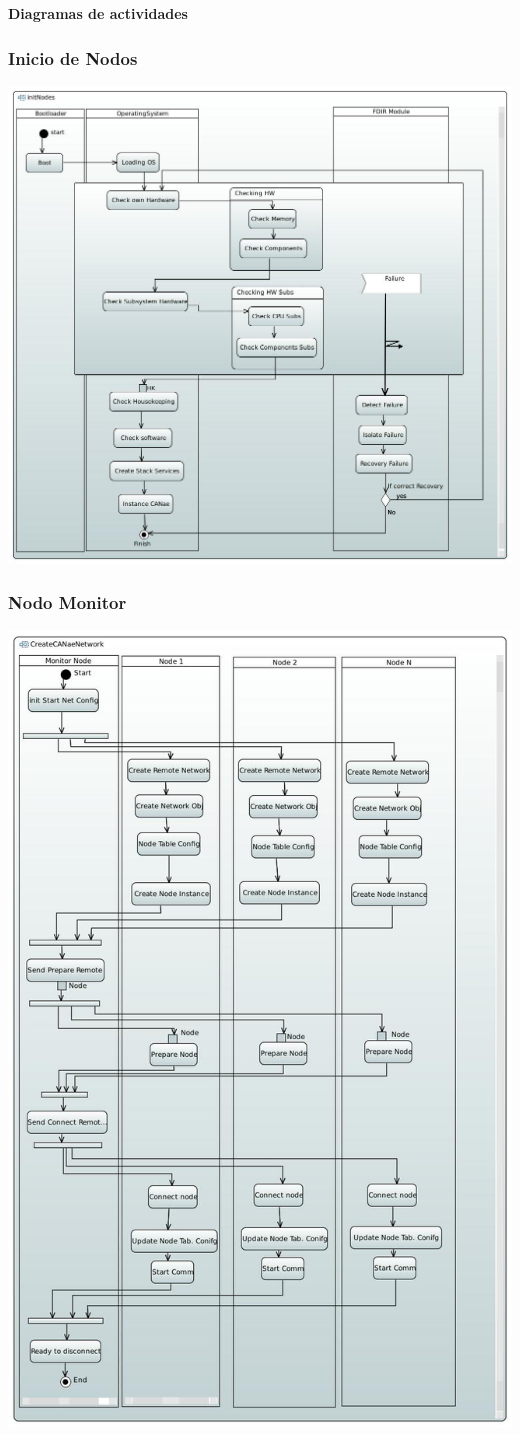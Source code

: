 \begin{frame}[c]
	\centering
	\LARGE \textbf{Diagramas de actividades}
\end{frame}

\begin{frame}[c]
	\frametitle{Inicio de Nodos}
	\centering
	\includegraphics[scale=0.22]{images/initNodes.JPG}
\end{frame}

\begin{frame}[c]
	\frametitle{Nodo Monitor}
	\centering
	\includegraphics[scale=0.15]{images/NodeMonitor.JPG}
\end{frame}